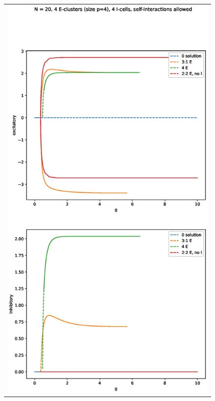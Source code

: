 \documentclass[11pt,reqno]{amsart}
\begin{document}
\begin{figure}[H]
\centering
\begin{tabular}{c}
\includegraphics[width=12cm]{images/bifdiagc4p4i4selfint.eps}
\end{tabular}
\end{figure}




\end{document}
